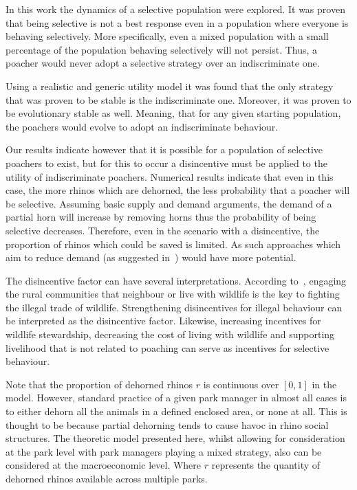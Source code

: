 \documentclass[10pt]{article}
\begin{document}
In this work the dynamics of a selective population were explored. It was proven 
that being selective is not a best response even in a population where
everyone is behaving selectively. More specifically, even a mixed population with
a small percentage of the population behaving selectively will not persist. Thus,
a poacher would never adopt a selective strategy over an indiscriminate one.

Using a realistic and generic utility model it was found that
the only strategy that was proven to be stable is the indiscriminate one.
Moreover, it was proven to be evolutionary stable as well. Meaning,
that for any given starting population, the poachers would evolve to adopt an
indiscriminate behaviour.

Our results indicate however that it is possible for a population of selective
poachers to exist, but for this to occur a disincentive must be applied to the
utility of indiscriminate poachers. Numerical results indicate that even in this
case, the more rhinos which are dehorned, the less probability that a poacher
will be selective. Assuming basic supply and demand arguments, the demand of
a partial horn will increase by removing horns thus the probability
of being selective decreases. Therefore, even in the scenario with a
disincentive, the proportion of rhinos which could be saved is limited.
As such approaches which aim to reduce demand (as suggested in~\cite{Duan2013})
would have more potential.

The disincentive factor can have several interpretations. According to~\cite{Duan2017},
engaging the rural communities that neighbour or live with wildlife is the
key to fighting the illegal trade of wildlife. Strengthening disincentives for
illegal behaviour can be interpreted as the disincentive factor. Likewise,
increasing incentives for wildlife stewardship, decreasing the cost of living
with wildlife and supporting livelihood that is not related to poaching can 
serve as incentives for selective behaviour.

Note that the proportion of dehorned rhinos \(r\) is continuous over \([0, 1]\)
in the model. However, standard practice of a given park manager in almost all 
cases is to either dehorn all the animals in a defined enclosed area, or none 
at all. This is thought to be because partial dehorning tends to cause havoc in 
rhino social structures. The theoretic model presented here, whilst allowing for
consideration at the park level with park managers playing a mixed strategy, also
can be considered at the macroeconomic level. Where \(r\) represents the quantity
of dehorned rhinos available across multiple parks. 
\end{document}
